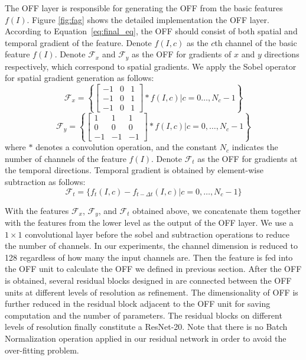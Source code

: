 \documentclass[10pt,twocolumn,letterpaper]{article}
\begin{document}
The OFF layer is responsible for generating the OFF from the basic features $f(I)$. Figure \ref{fig:fag} shows the detailed implementation the OFF layer. According to Equation~\ref{eq:final_eq}, the OFF should consist of both spatial and temporal gradient of the feature. Denote $f(I, c)$ as the $c$th channel of the basic feature $f(I)$. Denote $\mathcal{F}_x$ and $\mathcal{F}_y$ as the OFF for gradients of $x$ and $y$ directions respectively, which correspond to spatial gradients.
 We apply the Sobel operator for spatial gradient generation as follows:
\begin{equation}
\mathcal{F}_{x} = \left\{ \begin{bmatrix}
-1 & 0 & 1 \\
-1 & 0 & 1 \\
-1 & 0 & 1 
\end{bmatrix} * f(I, c) \bigg\vert  c = 0 \ldots, N_c - 1 \right\} 
\end{equation}
\begin{equation}
\mathcal{F}_{y} = \left\{ \begin{bmatrix}
1 & 1 & 1 \\
0 & 0 & 0 \\
-1 & -1 & -1
\end{bmatrix} * f(I, c)　\bigg\vert c = 0, \ldots, N_c - 1 \right\}
\end{equation}
where $\ast$ denotes a convolution operation, and the constant $N_{c}$ indicates the number of channels of the feature $f(I)$. 
 Denote $\mathcal{F}_t$ as the OFF for gradients at the temporal directions.  Temporal gradient is obtained by element-wise subtraction as follows:
\begin{equation}
\mathcal{F}_{t} = \{ f_{t}(I, c) - f_{t-\Delta t}(I, c) | c = 0, \ldots, N_c-1\}
\end{equation}

With the features $\mathcal{F}_x$, $\mathcal{F}_y$, and $\mathcal{F}_t$ obtained above, we concatenate them together with the features from the lower level as the output of the OFF layer. We use a $1\times 1$ convolutional layer before the sobel and subtraction operations to reduce the number of channels. In our experiments, the channel dimension is reduced to 128 regardless of how many the input channels are. Then the feature is fed into the OFF unit to calculate the OFF we defined in previous section.
After the OFF is obtained, several residual blocks designed in \cite{he2016resnet} are connected between the OFF units at different levels of resolution as refinement. The dimensionality of OFF is further reduced in the residual block adjacent to the OFF unit for saving computation and the number of parameters. The residual blocks on different levels of resolution finally constitute a ResNet-20. Note that there is no Batch Normalization \cite{ioffe2015batchnorm} operation applied in our residual network in order to avoid the over-fitting problem.
\end{document}
